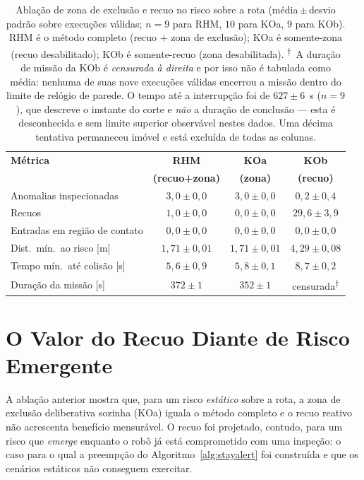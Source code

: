 \begin{table}[htb]
\centering
\caption{Ablação de zona de exclusão e recuo no risco sobre a rota
(média\,$\pm$\,desvio padrão sobre execuções válidas; $n=9$ para RHM, $10$ para KOa,
$9$ para KOb). RHM é o método completo (recuo $+$ zona de exclusão); KOa é
somente-zona (recuo desabilitado); KOb é somente-recuo (zona desabilitada). \textsuperscript{$\dagger$}~A duração de
missão da KOb é \emph{censurada à direita} e por isso não é tabulada como média:
nenhuma de suas nove execuções válidas encerrou a missão dentro do limite de relógio de
parede. O tempo até a interrupção foi de $627\pm6$~s ($n=9$), que descreve o instante
do corte e \emph{não} a duração de conclusão --- esta é desconhecida e sem limite
superior observável nestes dados. Uma décima tentativa permaneceu imóvel e está
excluída de todas as colunas.}
\label{tab:res-ablacao}
\footnotesize
\setlength{\tabcolsep}{5pt}
\begin{tabular}{lccc}
\hline
\textbf{Métrica} & \textbf{RHM} & \textbf{KOa} & \textbf{KOb}\\
 & \textbf{(recuo+zona)} & \textbf{(zona)} & \textbf{(recuo)}\\
\hline
Anomalias inspecionadas     & $3{,}0\pm0{,}0$   & $3{,}0\pm0{,}0$   & $0{,}2\pm0{,}4$\\
Recuos                      & $1{,}0\pm0{,}0$   & $0{,}0\pm0{,}0$   & $29{,}6\pm3{,}9$\\
Entradas em região de contato & $0{,}0\pm0{,}0$ & $0{,}0\pm0{,}0$   & $0{,}0\pm0{,}0$\\
Dist.\ mín.\ ao risco [m]   & $1{,}71\pm0{,}01$ & $1{,}71\pm0{,}01$ & $4{,}29\pm0{,}08$\\
Tempo mín.\ até colisão [s] & $5{,}6\pm0{,}9$   & $5{,}8\pm0{,}1$   & $8{,}7\pm0{,}2$\\
Duração da missão [s]       & $372\pm1$         & $352\pm1$         & censurada\textsuperscript{$\dagger$}\\
\hline
\end{tabular}
\end{table}

\section{O Valor do Recuo Diante de Risco Emergente}
\label{sec:res-emergente}

A ablação anterior mostra que, para um risco \emph{estático} sobre a rota, a zona de
exclusão deliberativa sozinha (KOa) iguala o método completo e o recuo reativo não
acrescenta benefício mensurável. O recuo foi projetado, contudo, para um risco que
\emph{emerge} enquanto o robô já está comprometido com uma inspeção: o caso para o
qual a preempção do Algoritmo~\ref{alg:stayalert} foi construída e que os cenários
estáticos não conseguem exercitar.

